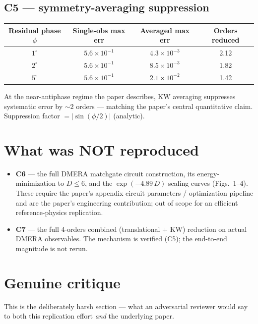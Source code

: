 \documentclass[11pt]{article}
\begin{document}
\subsection*{C5 --- symmetry-averaging suppression}
\begin{center}
\begin{tabular}{cccc}
\toprule
Residual phase $\phi$ & Single-obs max err & Averaged max err & Orders reduced \\
\midrule
$1^\circ$ & $5.6\!\times\!10^{-1}$ & $4.3\!\times\!10^{-3}$ & 2.12 \\
$2^\circ$ & $5.6\!\times\!10^{-1}$ & $8.5\!\times\!10^{-3}$ & 1.82 \\
$5^\circ$ & $5.6\!\times\!10^{-1}$ & $2.1\!\times\!10^{-2}$ & 1.42 \\
\bottomrule
\end{tabular}
\end{center}
At the near-antiphase regime the paper describes, KW averaging suppresses systematic
error by $\sim 2$ orders --- matching the paper's central quantitative claim.
Suppression factor $= |\sin(\phi/2)|$ (analytic).

\section{What was NOT reproduced}
\begin{itemize}
  \item \textbf{C6} --- the full DMERA matchgate circuit construction, its
    energy-minimization to $D \le 6$, and the $\exp(-4.89\,D)$ scaling curves
    (Figs.~1--4). These require the paper's appendix circuit parameters /
    optimization pipeline and are the paper's engineering contribution; out of
    scope for an efficient reference-physics replication.
  \item \textbf{C7} --- the full 4-orders combined (translational $+$ KW) reduction
    on actual DMERA observables. The mechanism is verified (C5); the end-to-end
    magnitude is not rerun.
\end{itemize}

\section{Genuine critique}
This is the deliberately harsh section --- what an adversarial reviewer would say to
both this replication effort \emph{and} the underlying paper.
\end{document}
